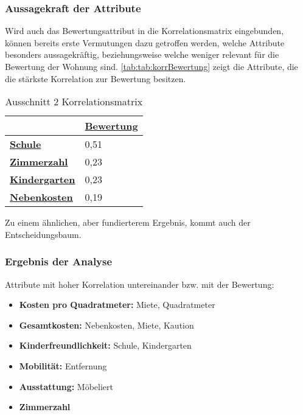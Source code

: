 \subsubsection{Aussagekraft der Attribute}
Wird auch das Bewertungsattribut in die Korrelationsmatrix eingebunden, können bereits erste Vermutungen dazu getroffen werden, 
welche Attribute besonders aussagekräftig, beziehungsweise welche weniger relevant für die Bewertung der Wohnung sind. 
\autoref{tab:tab:korrBewertung} zeigt die Attribute, die die stärkste Korrelation zur Bewertung besitzen.
\useunder{\uline}{\ul}{}
\begin{table}[h]
    \begin{center}
        \begin{tabular}{|l|l|}
            \hline
            {\ul \textbf{}}              & {\ul \textbf{Bewertung}} \\ \hline
            {\ul \textbf{Schule}}        & 0,51                        \\ \hline
            {\ul \textbf{Zimmerzahl}}    & 0,23                     \\ \hline
            {\ul \textbf{Kindergarten}}  & 0,23                     \\ \hline
            {\ul \textbf{Nebenkosten}}   & 0,19                     \\ \hline
        \end{tabular}
        \caption{Ausschnitt 2 Korrelationsmatrix}
        \label{tab:korrBewertung}
    \end{center}
\end{table}
Zu einem ähnlichen, aber fundierterem Ergebnis, kommt auch der Entscheidungsbaum. 

\subsubsection{Ergebnis der Analyse}
Attribute mit hoher Korrelation untereinander bzw. mit der Bewertung:
\begin{itemize}
    \item \textbf{Kosten pro Quadratmeter:} Miete, Quadratmeter
    \item \textbf{Gesamtkosten:} Nebenkosten, Miete, Kaution
    \item \textbf{Kinderfreundlichkeit:} Schule, Kindergarten
    \item \textbf{Mobilität:} Entfernung
    \item \textbf{Ausstattung:} Möbeliert
    \item \textbf{Zimmerzahl}
\end{itemize}

